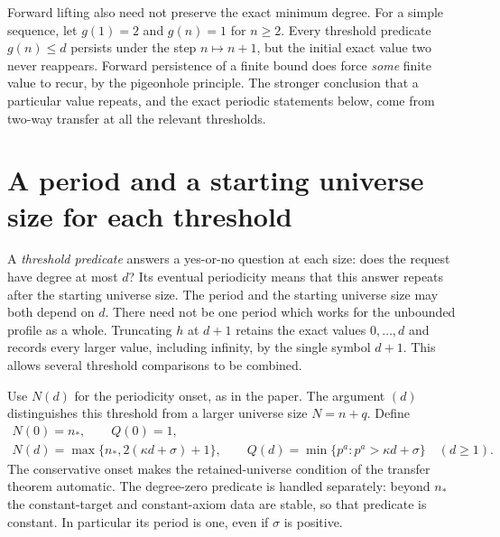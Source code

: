 Forward lifting also need not preserve the exact minimum degree.
For a simple sequence, let $g(1)=2$ and $g(n)=1$ for $n\ge2$.
Every threshold predicate $g(n)\le d$ persists under the step $n\mapsto
n+1$, but the initial exact value two never reappears. Forward
persistence of a finite bound does force \emph{some} finite value to
recur, by the pigeonhole principle. The stronger conclusion that a
particular value repeats, and the exact periodic statements below,
come from two-way transfer at all the relevant thresholds.

\section{A period and a starting universe size for each threshold}
A \emph{threshold predicate} answers a yes-or-no question at each
size: does the request have degree at most $d$? Its eventual
periodicity means that this answer repeats after the starting universe size.
The period and the starting universe size may both depend on $d$.
There need not be one period which works for the unbounded profile
as a whole.
Truncating $h$ at $d+1$ retains the exact values $0,\ldots,d$ and
records every larger value, including infinity, by the single symbol
$d+1$. This allows several threshold comparisons to be combined.

Use $N(d)$ for the periodicity onset, as in the paper. The argument
$(d)$ distinguishes this threshold from a larger universe size
$N=n+q$. Define
\begin{equation}\label{tx:eq:NQ}
 \begin{gathered}
 N(0)=n_*,\qquad Q(0)=1,\\
 N(d)=\max\{n_*,2(\kappa d+\sigma)+1\},\qquad
 Q(d)=\min\{p^a:p^a>\kappa d+\sigma\}\quad(d\ge1).
 \end{gathered}
\end{equation}
The conservative onset makes the retained-universe condition of the
transfer theorem automatic. The degree-zero predicate is handled
separately: beyond $n_*$ the constant-target and constant-axiom data
are stable, so that predicate is constant. In particular its period
is one, even if $\sigma$ is positive.

